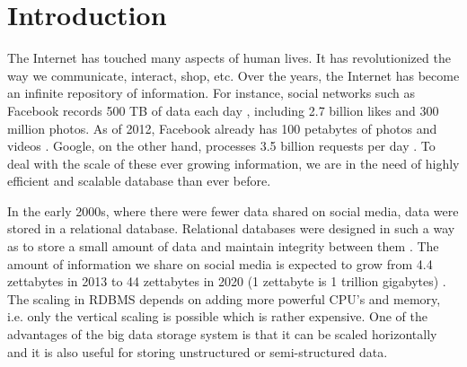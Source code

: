 \documentclass[11pt,a4paper,bibtotoc,idxtotoc,headsepline,footsepline,footexclude,BCOR12mm,DIV13]{scrbook}
\begin{document}
	\frontmatter
	
	
	
	
	
%	
	\clearemptydoublepage
	
	
	
	
	
	
	
	
	

	\tableofcontents


  

	\mainmatter
	
	



\chapter{Introduction}
\label{chap:introduction}

The Internet has touched many aspects of human lives. It has revolutionized the way we communicate, interact, shop, etc. Over the years, the Internet has become an infinite repository of information. For instance, social networks such as Facebook records 500 TB of data each day \cite{daniel:datastats}, including 2.7 billion likes and 300 million photos. As of 2012, Facebook already has 100 petabytes of photos and videos \cite{daniel:datastats}. Google, on the other hand, processes 3.5 billion requests per day \cite{daniel:datastats}. To deal with the scale of these ever growing information, we are in the need of highly efficient and scalable database than ever before. 

In the early 2000s, where there were fewer data shared on social media, data were stored in a relational database. Relational databases were designed in such a way as to store a small amount of data and maintain integrity between them \cite{matt:rdb}. The amount of information we share on social media is expected to grow from 4.4 zettabytes in 2013 to 44 zettabytes in 2020 (1 zettabyte is 1 trillion gigabytes) \cite{matt:rdb}. The scaling in RDBMS depends on adding more powerful CPU's and memory, i.e. only the vertical scaling is possible which is rather expensive.  One of the advantages of the big data storage system is that it can be scaled horizontally and it is also useful for storing unstructured or semi-structured data. 
\end{document}
